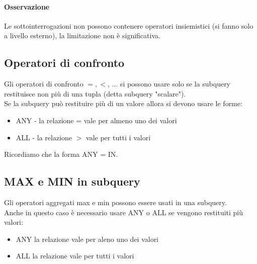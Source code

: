 \paragraph*{Osservazione} Le sottointerrogazioni non possono contenere operatori insiemistici (si fanno
solo a livello esterno), la limitazione non è significativa.
\subsection{Operatori di confronto}
Gli operatori di confronto $=, <$, ... si possono usare solo se la subquery restituisce
non più di una tupla (detta subquery "scalare").\\
Se la subquery può restituire più di un valore allora si devono usare le forme:
\begin{itemize}
  \item ANY - la relazione = vale per almeno uno dei valori
  \item ALL - la relazione $>$ vale per tutti i valori
\end{itemize}
Ricordiamo che la forma ANY = IN.
\subsection{MAX e MIN in subquery}
Gli operatori aggregati max e min possono essere usati in una subquery.\\
Anche in questo caso è necessario usare ANY o ALL se vengono restituiti più valori:
\begin{itemize}
  \item ANY la relazione vale per aleno uno dei valori
  \item ALL la relazione vale per tutti i valori
\end{itemize}
